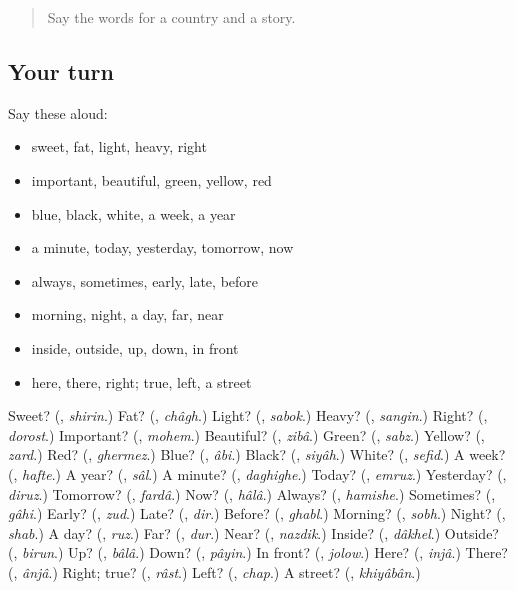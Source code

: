 \begin{quote}
Say the words for a country and a story.
\end{quote}

\subsection*{Your turn}
Say these aloud:

\begin{itemize}
\raggedright
  \item sweet, fat, light, heavy, right
  \item important, beautiful, green, yellow, red
  \item blue, black, white, a week, a year
  \item a minute, today, yesterday, tomorrow, now
  \item always, sometimes, early, late, before
  \item morning, night, a day, far, near
  \item inside, outside, up, down, in front
  \item here, there, right; true, left, a street
\end{itemize}

\begin{tcolorbox}[breakable,colback=teal!4,colframe=teal!35!black,title={Before you move on}]
Sweet? (\textbf{}, \emph{shirin}.) Fat? (\textbf{}, \emph{châgh}.) Light? (\textbf{}, \emph{sabok}.) Heavy? (\textbf{}, \emph{sangin}.) Right? (\textbf{}, \emph{dorost}.) Important? (\textbf{}, \emph{mohem}.) Beautiful? (\textbf{}, \emph{zibâ}.) Green? (\textbf{}, \emph{sabz}.) Yellow? (\textbf{}, \emph{zard}.) Red? (\textbf{}, \emph{ghermez}.) Blue? (\textbf{}, \emph{âbi}.) Black? (\textbf{}, \emph{siyâh}.) White? (\textbf{}, \emph{sefid}.) A week? (\textbf{}, \emph{hafte}.) A year? (\textbf{}, \emph{sâl}.) A minute? (\textbf{}, \emph{daghighe}.) Today? (\textbf{}, \emph{emruz}.) Yesterday? (\textbf{}, \emph{diruz}.) Tomorrow? (\textbf{}, \emph{fardâ}.) Now? (\textbf{}, \emph{hâlâ}.) Always? (\textbf{}, \emph{hamishe}.) Sometimes? (\textbf{}, \emph{gâhi}.) Early? (\textbf{}, \emph{zud}.) Late? (\textbf{}, \emph{dir}.) Before? (\textbf{}, \emph{ghabl}.) Morning? (\textbf{}, \emph{sobh}.) Night? (\textbf{}, \emph{shab}.) A day? (\textbf{}, \emph{ruz}.) Far? (\textbf{}, \emph{dur}.) Near? (\textbf{}, \emph{nazdik}.) Inside? (\textbf{}, \emph{dâkhel}.) Outside? (\textbf{}, \emph{birun}.) Up? (\textbf{}, \emph{bâlâ}.) Down? (\textbf{}, \emph{pâyin}.) In front? (\textbf{}, \emph{jolow}.) Here? (\textbf{}, \emph{injâ}.) There? (\textbf{}, \emph{ânjâ}.) Right; true? (\textbf{}, \emph{râst}.) Left? (\textbf{}, \emph{chap}.) A street? (\textbf{}, \emph{khiyâbân}.)
\end{tcolorbox}
